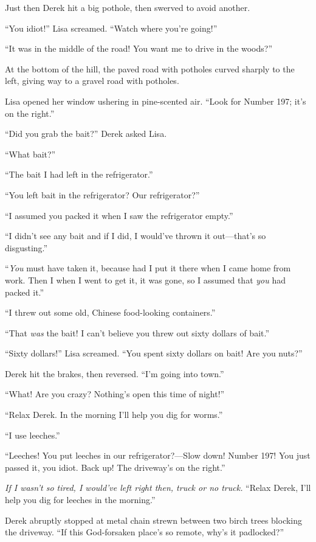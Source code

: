 Just then Derek hit a big pothole, then swerved to avoid another.

``You idiot!'' Lisa screamed. ``Watch where you're going!''

``It was in the middle of the road! You want me to drive in the woods?''

At the bottom of the hill, the paved road with potholes curved sharply
to the left, giving way to a gravel road with potholes.

Lisa opened her window ushering in pine-scented air. ``Look for Number
197; it's on the right.''

``Did you grab the bait?'' Derek asked Lisa.

``What bait?''

``The bait I had left in the refrigerator.''

``You left bait in the refrigerator? Our refrigerator?''

``I assumed you packed it when I saw the refrigerator empty.''

``I didn't see any bait and if I did, I would've thrown it out---that's
so disgusting.''

``\emph{You} must have taken it, because had I put it there when I came
home from work. Then I when I went to get it, it was gone, so I assumed
that \emph{you} had packed it.''

``I threw out some old, Chinese food-looking containers.''

``That \emph{was} the bait! I can't believe you threw out sixty dollars
of bait.''

``Sixty dollars!'' Lisa screamed. ``You spent sixty dollars on bait! Are
you nuts?''

Derek hit the brakes, then reversed. ``I'm going into town.''

``What! Are you crazy? Nothing's open this time of night!''

``Relax Derek. In the morning I'll help you dig for worms.''

``I use leeches.''

``Leeches! You put leeches in our refrigerator?---Slow down! Number 197!
You just passed it, you idiot. Back up! The driveway's on the right.''

\emph{If I wasn't so tired, I would've left right then, truck or no
truck.} ``Relax Derek, I'll help you dig for leeches in the morning.''

Derek abruptly stopped at metal chain strewn between two birch trees
blocking the driveway. ``If this God-forsaken place's so remote, why's
it padlocked?''

